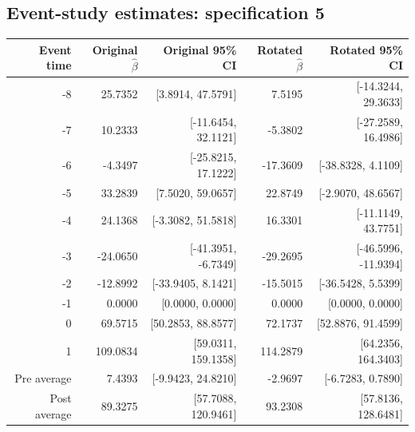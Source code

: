 \documentclass[10pt]{article}
\begin{document}
\subsection*{Event-study estimates: specification 5}
\begin{center}\scriptsize
\begin{tabular}{r rr rr}
\toprule
Event time & Original $\hat\beta$ & Original 95\% CI & Rotated $\hat\beta$ & Rotated 95\% CI \\
\midrule
-8 & 25.7352 & [3.8914, 47.5791] & 7.5195 & [-14.3244, 29.3633] \\
-7 & 10.2333 & [-11.6454, 32.1121] & -5.3802 & [-27.2589, 16.4986] \\
-6 & -4.3497 & [-25.8215, 17.1222] & -17.3609 & [-38.8328, 4.1109] \\
-5 & 33.2839 & [7.5020, 59.0657] & 22.8749 & [-2.9070, 48.6567] \\
-4 & 24.1368 & [-3.3082, 51.5818] & 16.3301 & [-11.1149, 43.7751] \\
-3 & -24.0650 & [-41.3951, -6.7349] & -29.2695 & [-46.5996, -11.9394] \\
-2 & -12.8992 & [-33.9405, 8.1421] & -15.5015 & [-36.5428, 5.5399] \\
-1 & 0.0000 & [0.0000, 0.0000] & 0.0000 & [0.0000, 0.0000] \\
0 & 69.5715 & [50.2853, 88.8577] & 72.1737 & [52.8876, 91.4599] \\
1 & 109.0834 & [59.0311, 159.1358] & 114.2879 & [64.2356, 164.3403] \\
\midrule
Pre average & 7.4393 & [-9.9423, 24.8210] & -2.9697 & [-6.7283, 0.7890] \\
Post average & 89.3275 & [57.7088, 120.9461] & 93.2308 & [57.8136, 128.6481] \\
\bottomrule
\end{tabular}
\end{center}
\clearpage
\end{document}
